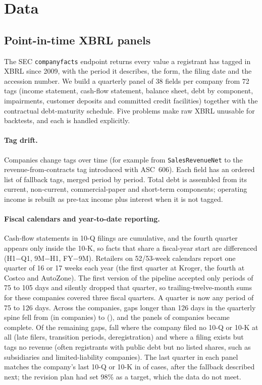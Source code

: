 \section{Data}\label{sec:data}

\subsection{Point-in-time XBRL panels}
The SEC \texttt{companyfacts} endpoint returns every value a registrant has tagged in XBRL since 2009, with the period it describes, the form, the filing date and the accession number. We build a quarterly panel of 38 fields per company from 72 tags (income statement, cash-flow statement, balance sheet, debt by component, impairments, customer deposits and committed credit facilities) together with the contractual debt-maturity schedule. Five problems make raw XBRL unusable for backtests, and each is handled explicitly.

\paragraph{Tag drift.} Companies change tags over time (for example from \texttt{SalesRevenueNet} to the revenue-from-contracts tag introduced with ASC~606). Each field has an ordered list of fallback tags, merged period by period. Total debt is assembled from its current, non-current, commercial-paper and short-term components; operating income is rebuilt as pre-tax income plus interest when it is not tagged.

\paragraph{Fiscal calendars and year-to-date reporting.} Cash-flow statements in 10-Q filings are cumulative, and the fourth quarter appears only inside the 10-K, so facts that share a fiscal-year start are differenced (H1$-$Q1, 9M$-$H1, FY$-$9M). Retailers on 52/53-week calendars report one quarter of 16 or 17 weeks each year (the first quarter at Kroger, the fourth at Costco and AutoZone). The first version of the pipeline accepted only periods of 75 to 105 days and silently dropped that quarter, so trailing-twelve-month sums for these companies covered three fiscal quarters. A quarter is now any period of 75 to 126 days. Across the \AudLoaded{} companies, gaps longer than 126 days in the quarterly spine fell from \AudGapsOld{} (in \AudFirmsOld{} companies) to \AudGapsNew{} (\AudFirmsNew{}), and the panels of \AudRecovered{} companies became complete. Of the remaining gaps, \AudNoFiling{} fall where the company filed no 10-Q or 10-K at all (late filers, transition periods, deregistration) and \AudUntagged{} where a filing exists but tags no revenue (often registrants with public debt but no listed shares, such as subsidiaries and limited-liability companies). The last quarter in each panel matches the company's last 10-Q or 10-K in \AudLatest{} of cases, after the fallback described next; the revision plan had set 98\% as a target, which the data do not meet.

